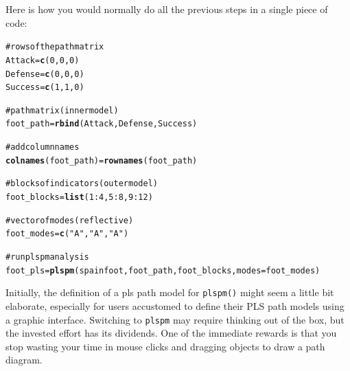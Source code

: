 \documentclass[12pt]{book}\usepackage{graphicx, color}
\makeatletter
\newcommand{\hlfunctioncall}[1]{\textcolor[rgb]{0.501960784313725,0,0.329411764705882}{\textbf{#1}}}%
\newcommand{\hlstring}[1]{\textcolor[rgb]{0.6,0.6,1}{#1}}%
\newcommand{\hlcomment}[1]{\textcolor[rgb]{0.180392156862745,0.6,0.341176470588235}{#1}}%
\newenvironment{kframe}{%
 \def\at@end@of@kframe{}%
 \ifinner\ifhmode%
  \def\at@end@of@kframe{\end{minipage}}%
  \begin{minipage}{\columnwidth}%
 \fi\fi%
 \def\FrameCommand##1{\hskip\@totalleftmargin \hskip-\fboxsep
 \colorbox{shadecolor}{##1}\hskip-\fboxsep
     \hskip-\linewidth \hskip-\@totalleftmargin \hskip\columnwidth}%
 \MakeFramed {\advance\hsize-\width
   \@totalleftmargin\z@ \linewidth\hsize
   \@setminipage}}%
 {\par\unskip\endMakeFramed%
 \at@end@of@kframe}
\newenvironment{knitrout}{}{} %
\newcommand{\plspm}{\texttt{plspm}}
\newcommand{\fplspm}{\texttt{plspm()}}
\makeatother
\begin{document}
Here is how you would normally do all the previous steps in a single piece of code:
\begin{knitrout}
\color{fgcolor}\begin{kframe}
\begin{alltt}
\hlcomment{# rows of the path matrix}
Attack = \hlfunctioncall{c}(0, 0, 0)
Defense = \hlfunctioncall{c}(0, 0, 0)
Success = \hlfunctioncall{c}(1, 1, 0)

\hlcomment{# path matrix (inner model)}
foot_path = \hlfunctioncall{rbind}(Attack, Defense, Success)

\hlcomment{# add column names}
\hlfunctioncall{colnames}(foot_path) = \hlfunctioncall{rownames}(foot_path)

\hlcomment{# blocks of indicators (outer model)}
foot_blocks = \hlfunctioncall{list}(1:4, 5:8, 9:12)

\hlcomment{# vector of modes (reflective)}
foot_modes = \hlfunctioncall{c}(\hlstring{"A"}, \hlstring{"A"}, \hlstring{"A"})

\hlcomment{# run plspm analysis}
foot_pls = \hlfunctioncall{plspm}(spainfoot, foot_path, foot_blocks, modes = foot_modes)
\end{alltt}
\end{kframe}
\end{knitrout}


Initially, the definition of a pls path model for \fplspm{} might seem a little bit elaborate, especially for users accustomed to define their PLS path models using a graphic interface. Switching to \plspm{} may require thinking out of the box, but the invested effort has its dividends. One of the immediate rewards is that you stop wasting your time in mouse clicks and dragging objects to draw a path diagram. 
\end{document}

